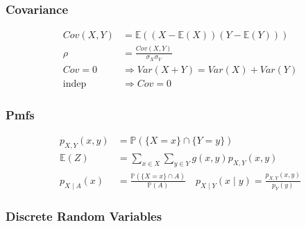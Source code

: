 \documentclass[10pt]{article}
\begin{document}
\begin{multicols}{2}
\subsubsection*{Covariance}
\begin{equation*}
  \boxed{
    \begin{aligned}
      Cov(X,Y) &= \mathbb{E}((X - \mathbb{E}(X))(Y-\mathbb{E}(Y))) \\
      \rho &= \frac{Cov(X,Y)}{\sigma_X \sigma_Y} \\
      Cov = 0 &\Rightarrow Var(X + Y) = Var(X) + Var(Y) \\
      \text{indep} &\Rightarrow Cov = 0
    \end{aligned}
  }
\end{equation*}

\columnbreak
\subsubsection*{Pmfs}

\begin{equation*}
  \boxed{
    \begin{aligned}
      p_{X,Y} (x,y) &= \mathbb{P}(\{X=x\} \cap \{Y=y\}) \\
      \mathbb{E}(Z) &= \sum_{x\in X} \sum_{y\in Y} g(x,y) p_{X,Y} (x,y) \\
      p_{X\mid A}(x) &= \frac{\mathbb{P}(\{X = x\} \cap A)}{\mathbb{P}(A)}
      \quad
      p_{X\mid Y}(x\mid y) = \frac{p_{X,Y}(x,y)}{p_Y(y)}
    \end{aligned}
  }
\end{equation*}

\end{multicols}


\subsubsection*{Discrete Random Variables}
\end{document}
